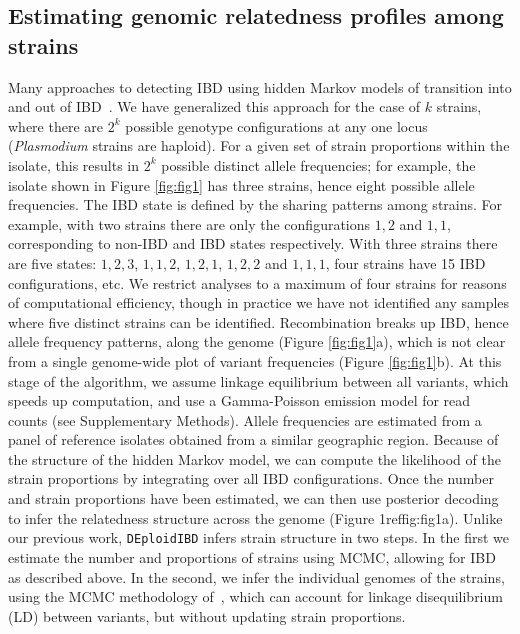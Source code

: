 \documentclass[9pt,lineno]{elife}
\begin{document}
\subsection{Estimating genomic relatedness profiles among strains}

Many approaches to detecting IBD using hidden Markov models of transition into and out of IBD~\citep{Chang2015, Gusev2009, Gusev2011}.  We have generalized this approach for the case of $k$ strains, where there are $2^k$ possible genotype configurations at any one locus ({\it Plasmodium} strains are haploid).  For a given set of strain proportions within the isolate, this results in $2^k$ possible distinct allele frequencies; for example, the isolate shown in Figure \ref{fig:fig1} has three strains, hence eight possible allele frequencies.  The IBD state is defined by the sharing patterns among strains.  For example, with two strains there are only the configurations ${1,2}$ and ${1,1}$, corresponding to non-IBD and IBD states respectively.  With three strains there are five states: ${1,2,3}$, ${1,1,2}$, ${1,2,1}$, ${1,2,2}$ and ${1,1,1}$, four strains have 15 IBD configurations, etc.  We restrict analyses to a maximum of four strains for reasons of computational efficiency, though in practice we have not identified any samples where five distinct strains can be identified.  Recombination breaks up IBD, hence allele frequency patterns, along the genome (Figure \ref{fig:fig1}a), which is not clear from a single genome-wide plot of variant frequencies (Figure \ref{fig:fig1}b).  At this stage of the algorithm, we assume linkage equilibrium between all variants, which speeds up computation, and use a Gamma-Poisson emission model for read counts (see Supplementary Methods).  Allele frequencies are estimated from a panel of reference isolates obtained from a similar geographic region.  Because of the structure of the hidden Markov model, we can compute the likelihood of the strain proportions by integrating over all IBD configurations.  Once the number and strain proportions have been estimated, we can then use posterior decoding to infer the relatedness structure across the genome (Figure 1ref{fig:fig1}a).
Unlike our previous work, \texttt{DEploidIBD} infers strain structure in two steps.  In the first we estimate the number and proportions of strains using MCMC, allowing for IBD as described above.  In the second, we infer the individual genomes of the strains, using the MCMC methodology of~\citet{Zhu2017}, which can account for linkage disequilibrium (LD) between variants, but without updating strain proportions.
\end{document}
